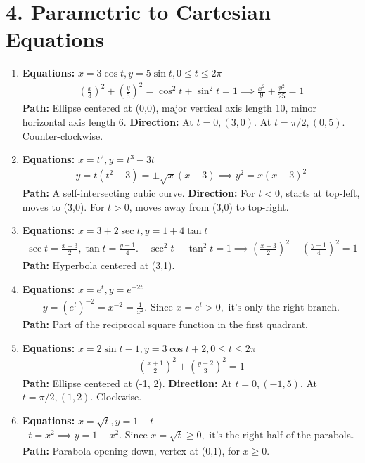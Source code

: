 \documentclass[12pt]{article}
\newcommand{\problemsettitle}[1]{\section*{#1}}
\begin{document}
\newpage
\problemsettitle{4. Parametric to Cartesian Equations}
\begin{enumerate}
    \item \textbf{Equations:} $x=3\cos t, y=5\sin t, 0 \le t \le 2\pi$
    \begin{align*}
        (\frac{x}{3})^2 + (\frac{y}{5})^2 = \cos^2 t + \sin^2 t = 1 \implies \frac{x^2}{9} + \frac{y^2}{25} = 1
    \end{align*}
    \textbf{Path:} Ellipse centered at (0,0), major vertical axis length 10, minor horizontal axis length 6.
    \textbf{Direction:} At $t=0, (3,0)$. At $t=\pi/2, (0,5)$. Counter-clockwise.

    \item \textbf{Equations:} $x=t^2, y=t^3-3t$
    \begin{align*}
        y = t(t^2-3) = \pm\sqrt{x}(x-3) \implies y^2 = x(x-3)^2
    \end{align*}
    \textbf{Path:} A self-intersecting cubic curve.
    \textbf{Direction:} For $t<0$, starts at top-left, moves to (3,0). For $t>0$, moves away from (3,0) to top-right.

    \item \textbf{Equations:} $x=3+2\sec t, y=1+4\tan t$
    \begin{align*}
        \sec t = \frac{x-3}{2}, \tan t = \frac{y-1}{4}. \quad \sec^2 t - \tan^2 t = 1 \implies (\frac{x-3}{2})^2 - (\frac{y-1}{4})^2 = 1
    \end{align*}
    \textbf{Path:} Hyperbola centered at (3,1).
    
    \item \textbf{Equations:} $x=e^t, y=e^{-2t}$
    \begin{align*}
        y = (e^t)^{-2} = x^{-2} = \frac{1}{x^2}. \text{ Since } x=e^t > 0, \text{ it's only the right branch.}
    \end{align*}
    \textbf{Path:} Part of the reciprocal square function in the first quadrant.
    
    \item \textbf{Equations:} $x=2\sin t - 1, y=3\cos t + 2, 0 \le t \le 2\pi$
    \begin{align*}
        (\frac{x+1}{2})^2 + (\frac{y-2}{3})^2 = 1
    \end{align*}
    \textbf{Path:} Ellipse centered at (-1, 2).
    \textbf{Direction:} At $t=0, (-1,5)$. At $t=\pi/2, (1,2)$. Clockwise.

    \item \textbf{Equations:} $x=\sqrt{t}, y=1-t$
    \begin{align*}
        t=x^2 \implies y=1-x^2. \text{ Since } x=\sqrt{t} \ge 0, \text{ it's the right half of the parabola.}
    \end{align*}
    \textbf{Path:} Parabola opening down, vertex at (0,1), for $x \ge 0$.
    

\end{enumerate}
\end{document}

